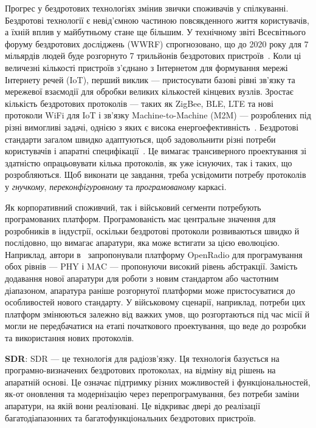 \documentclass[journal]{IEEEtran}
\newcommand{\acro}[2]{\textbf{#2}}
\begin{document}
Прогрес у бездротових технологіях змінив звички споживачів у спілкуванні. Бездротові технології є невід'ємною частиною повсякденного життя користувачів, а їхній вплив у майбутньому стане ще більшим. У технічному звіті Всесвітнього форуму бездротових досліджень (WWRF) спрогнозовано, що до 2020 року для 7 мільярдів людей буде розгорнуто 7 трильйонів бездротових пристроїв~\cite{wwrf09}. Коли ці величезні кількості пристроїв з'єднано з Інтернетом для формування мережі Інтернету речей (IoT), перший виклик — пристосувати базові рівні зв'язку та мережевої взаємодії для обробки великих кількостей кінцевих вузлів. Зростає кількість бездротових протоколів — таких як ZigBee, BLE, LTE та нові протоколи WiFi для IoT і зв'язку Machine-to-Machine (M2M) — розроблених під різні вимогливі задачі, однією з яких є висока енергоефективність~\cite{Al-Fuqaha2015}. Бездротові стандарти загалом швидко адаптуються, щоб задовольнити різні потреби користувачів і апаратні специфікації~\cite{IEEE,3GPP}. Це вимагає трансиверного проектування зі здатністю опрацьовувати кілька протоколів, як уже існуючих, так і таких, що розробляються. Щоб виконати це завдання, треба усвідомити потребу протоколів у \textit{гнучкому}, \textit{переконфігуровному} та \textit{програмованому} каркасі.

Як корпоративний споживчий, так і військовий сегменти потребують програмованих платформ. Програмованість має центральне значення для розробників в індустрії, оскільки бездротові протоколи розвиваються швидко й послідовно, що вимагає апаратури, яка може встигати за цією еволюцією. Наприклад, автори в~\cite{Bansal2012} запропонували платформу OpenRadio для програмування обох рівнів — PHY і MAC — пропонуючи високий рівень абстракції. Замість додавання нової апаратури для роботи з новим стандартом або частотним діапазоном, апаратура раніше розгорнутої платформи може пристосуватися до особливостей нового стандарту. У військовому сценарії, наприклад, потреби цих платформ змінюються залежно від важких умов, що розгортаються під час місії й могли не передбачатися на етапі початкового проектування, що веде до розробки та використання нових протоколів.

\acro{sdr}{SDR}: SDR — це технологія для радіозв'язку. Ця технологія базується на програмно-визначених бездротових протоколах, на відміну від рішень на апаратній основі. Це означає підтримку різних можливостей і функціональностей, як-от оновлення та модернізацію через перепрограмування, без потреби заміни апаратури, на якій вони реалізовані. Це відкриває двері до реалізації багатодіапазонних та багатофункціональних бездротових пристроїв.
\end{document}
